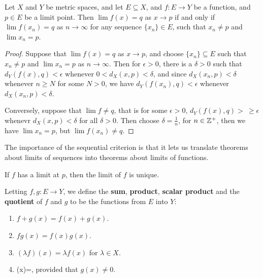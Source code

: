 \begin{theorem}\label{4.1.1}
    Let $X$ and  $Y$ be metric spaces, and let  $E \subseteq X$, and  $f:E \rightarrow Y$ be a function, 
    and  $p \in E$ be a limit point. Then  $\lim{f(x)}=q$ as  $x \rightarrow p$ if and only if 
    $\lim{f(x_n)}=q$ as  $n \rightarrow \infty$ for any sequence  $\{x_n\} \in E$, such 
    that  $x_n \neq p$ and  $\lim{x_n}=p$.
\end{theorem}
\begin{proof}
    Suppose that $\lim{f(x)}=q$ as  $x \rightarrow p$, and choose  $\{x_n\} \subseteq E$ such that 
    $x_n \neq p$ and  $\lim{x_n}=p$ as  $n \rightarrow \infty$. Then for  $\epsilon>0$, there is a  $\delta>0$ 
    such that  $d_Y(f(x),q)<\epsilon$ whenever  $0<d_X(x,p)<\delta$, and since  $d_X(x_n,p)<\delta$ 
    whenever $n \geq N$ for some  $N>0$, we have  $d_Y(f(x_n),q)<\epsilon$ whenever  $d_X(x_n,p)<\delta$. 

    Conversely, suppose that $\lim{f} \neq q$, that is for some  $\epsilon>0$,  $d_Y(f(x),q)>\ \geq \epsilon$ 
    whenevr  $d_X(x,p)<\delta$ for all  $\delta>0$. Then choose  $\delta=\frac{1}{n}$, for $n \in \mathbb{Z}^+$, 
    then we have $\lim{x_n}=p$, but  $\lim{f(x_n)} \neq q$.
\end{proof}

The importance of the sequential criterion is that it lets us translate theorems about limits 
of sequences into theorems about limits of functions.

\begin{corollary}
    If $f$ has a limit at  $p$, then the limit of  $f$ is unique.		
\end{corollary}

\begin{definition}
    Letting $f,g:E \rightarrow Y$, we define the  \textbf{sum}, \textbf{product}, \textbf{scalar product} and the 
    \textbf{quotient} of $f$ and  $g$ to be the functions from  $E$ into  $Y$:
         \begin{enumerate}[label=(\arabic*)]
             \item $f+g(x)=f(x)+g(x)$.

             \item $fg(x)=f(x)g(x)$.

             \item $(\lambda f)(x)=\lambda f(x)$ for $\lambda \in X$.

             \item {}(x)=, provided that $g(x) \neq 0$.
        \end{enumerate}
\end{definition}

